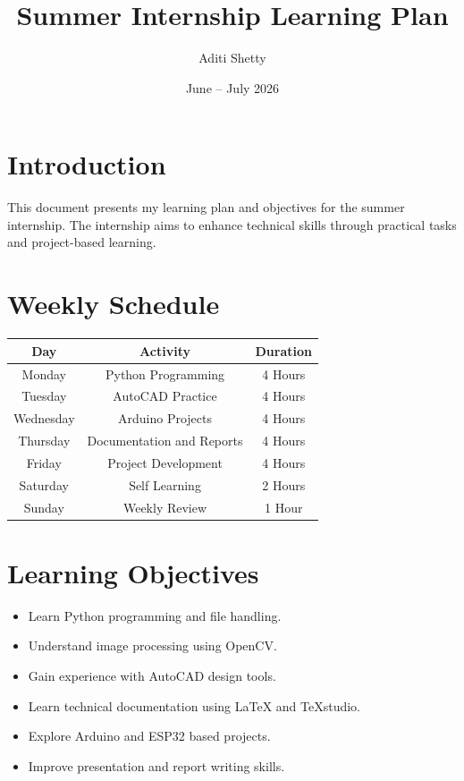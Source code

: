 \documentclass[a4paper,12pt]{article}
\title{\textbf{Summer Internship Learning Plan}}
\author{Aditi Shetty}
\date{June -- July 2026}
\begin{document}
	
	\maketitle
	
	\section{Introduction}
	
	This document presents my learning plan and objectives for the summer internship. The internship aims to enhance technical skills through practical tasks and project-based learning.
	
	\section{Weekly Schedule}
	
	\begin{center}
		\begin{tabular}{|c|c|c|}
			\hline
			\textbf{Day} & \textbf{Activity} & \textbf{Duration} \\
			\hline
			Monday & Python Programming & 4 Hours \\
			Tuesday & AutoCAD Practice & 4 Hours \\
			Wednesday & Arduino Projects & 4 Hours \\
			Thursday & Documentation and Reports & 4 Hours \\
			Friday & Project Development & 4 Hours \\
			Saturday & Self Learning & 2 Hours \\
			Sunday & Weekly Review & 1 Hour \\
			\hline
		\end{tabular}
	\end{center}
	
	\section{Learning Objectives}
	
	\begin{itemize}[leftmargin=*]
		\item Learn Python programming and file handling.
		\item Understand image processing using OpenCV.
		\item Gain experience with AutoCAD design tools.
		\item Learn technical documentation using LaTeX and TeXstudio.
		\item Explore Arduino and ESP32 based projects.
		\item Improve presentation and report writing skills.
	\end{itemize}
	
\end{document}
